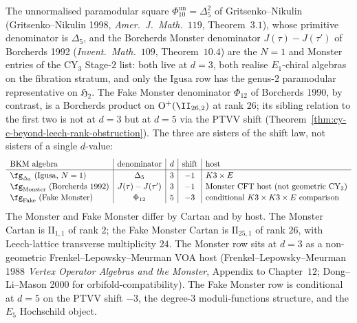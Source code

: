 \begin{remark}
\label{rem:cy-c-beyond-three-bkm-siblings}
The unnormalised paramodular square $\Phi_{10}^{\mathrm{un}} = \Delta_5^2$ of
Gritsenko--Nikulin (Gritsenko--Nikulin 1998, \emph{Amer.\ J.\ Math.}~$119$,
Theorem~$3.1$), whose primitive denominator is $\Delta_5$, and the Borcherds Monster denominator
$J(\tau) - J(\tau')$ of Borcherds 1992 (\emph{Invent.\ Math.}~$109$,
Theorem~$10.4$) are the $N = 1$ and Monster entries of the
CY$_3$ Stage-$2$ list: both live at
$d = 3$, both realise $E_1$-chiral algebras on the fibration stratum,
and only the Igusa row has the genus-$2$ paramodular representative on
\(\mathfrak H_2\). The Fake Monster denominator
$\Phi_{12}$ of Borcherds 1990, by contrast, is a Borcherds
product on $\mathrm{O}^+(\II_{26, 2})$ at rank $26$; its sibling relation
to the first two is not at $d = 3$ but at $d = 5$ via the PTVV shift
(Theorem~\ref{thm:cy-c-beyond-leech-rank-obstruction}).
The three are sisters of the shift law, not sisters of a single
$d$-value:
\[
\renewcommand{\arraystretch}{1.15}
\begin{array}{l|c|c|c|l}
 \text{BKM algebra} & \text{denominator} & d & \mathrm{shift} & \text{host} \\\hline
 \fg_{\Delta_5} \text{ (Igusa, } N = 1\text{)} & \Delta_5 & 3 & -1 & K3 \times E \\
 \fg_{\mathrm{Monster}} \text{ (Borcherds 1992)} & J(\tau)-J(\tau') & 3 & -1 & \text{Monster CFT host (not geometric CY$_3$)} \\
 \fg_{\mathrm{Fake}} \text{ (Fake Monster)} & \Phi_{12} & 5 & -3 & \text{conditional } K3 \times K3 \times E \text{ comparison}
\end{array}
\]
The Monster and Fake Monster differ by Cartan and by host. The Monster
Cartan is \(\mathrm{II}_{1,1}\) of rank \(2\); the Fake Monster Cartan
is \(\mathrm{II}_{25,1}\) of rank \(26\), with Leech-lattice transverse
multiplicity \(24\). The Monster row sits at \(d=3\) as a
non-geometric Frenkel--Lepowsky--Meurman VOA host
(Frenkel--Lepowsky--Meurman 1988 \emph{Vertex Operator Algebras and
the Monster}, Appendix to Chapter~$12$; Dong--Li--Mason 2000 for
orbifold-compatibility). The Fake Monster row is conditional at
\(d=5\) on the PTVV shift \(-3\), the degree-\(3\) moduli-functions
structure, and the \(E_5\) Hochschild object.
\end{remark}

